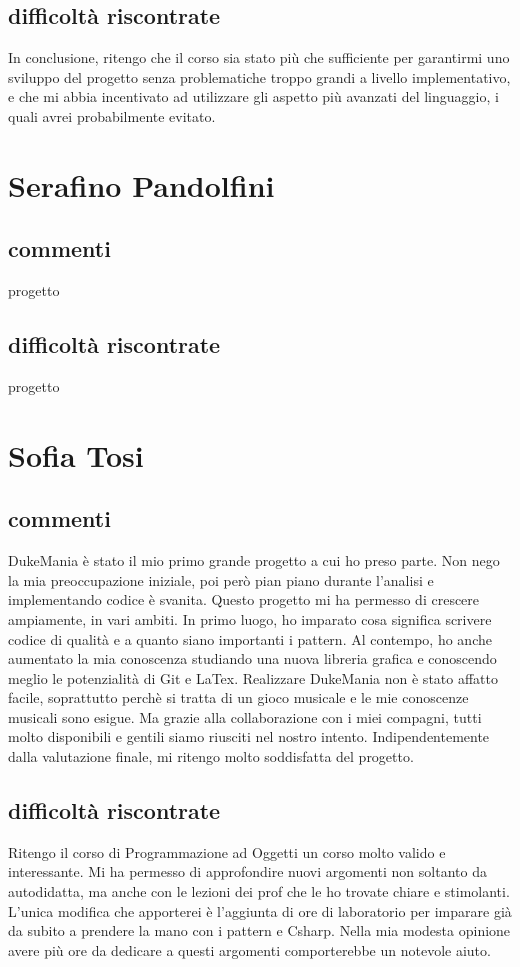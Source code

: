 \documentclass[a4paper,12pt]{report}
\begin{document}
\subsection{difficoltà riscontrate}
In conclusione, ritengo che il corso sia stato più che sufficiente per garantirmi uno sviluppo del progetto senza problematiche troppo grandi a livello implementativo, e che mi abbia incentivato ad utilizzare gli aspetto più avanzati del linguaggio, i quali avrei probabilmente evitato.
\newpage
\section{Serafino Pandolfini}
\subsection{commenti}
progetto 
\subsection{difficoltà riscontrate}
progetto 
\newpage
\section{Sofia Tosi}
\subsection{commenti}
DukeMania è stato il mio primo grande progetto a cui ho preso parte. 
Non nego la mia preoccupazione iniziale, poi però pian piano durante l'analisi e implementando codice è svanita.
Questo progetto mi ha permesso di crescere ampiamente, in vari ambiti.
In primo luogo, ho imparato cosa significa scrivere codice di qualità e a quanto siano importanti i pattern.
Al contempo, ho anche aumentato la mia conoscenza studiando una nuova libreria grafica e conoscendo meglio le potenzialità di Git e LaTex. 
Realizzare DukeMania non è stato affatto facile, soprattutto perchè si tratta di un gioco musicale e le mie conoscenze musicali
sono esigue. Ma grazie alla collaborazione con i miei compagni, tutti molto disponibili e gentili siamo riusciti nel nostro intento.
Indipendentemente dalla valutazione finale, mi ritengo molto soddisfatta del progetto.
\subsection{difficoltà riscontrate}
Ritengo il corso di Programmazione ad Oggetti un corso molto valido e interessante. 
Mi ha permesso di approfondire nuovi argomenti non soltanto da autodidatta, ma anche con le lezioni dei prof 
che le ho trovate chiare e stimolanti. L'unica modifica che apporterei è l'aggiunta di ore di laboratorio per
imparare già da subito a prendere la mano con i pattern e Csharp. Nella mia modesta opinione avere più ore da dedicare a questi argomenti
comporterebbe un notevole aiuto.
\newpage
\end{document}
